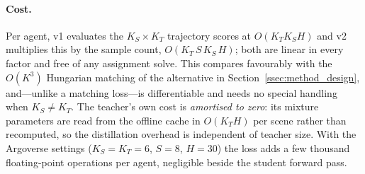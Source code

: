 \paragraph{Cost.}
Per agent, v1 evaluates the $K_S\times K_T$ trajectory scores at $O(K_T K_S H)$ and
v2 multiplies this by the sample count, $O(K_T\,S\,K_S\,H)$; both are linear in
every factor and free of any assignment solve. This compares favourably with the
$O(K^3)$ Hungarian matching of the alternative in
Section~\ref{ssec:method_design}, and---unlike a matching loss---is differentiable
and needs no special handling when $K_S\neq K_T$. The teacher's own cost is
\emph{amortised to zero}: its mixture parameters are read from the offline cache in
$O(K_T H)$ per scene rather than recomputed, so the distillation overhead is
independent of teacher size. With the Argoverse settings
($K_S{=}K_T{=}6$, $S{=}8$, $H{=}30$) the loss adds a few thousand floating-point
operations per agent, negligible beside the student forward pass.
